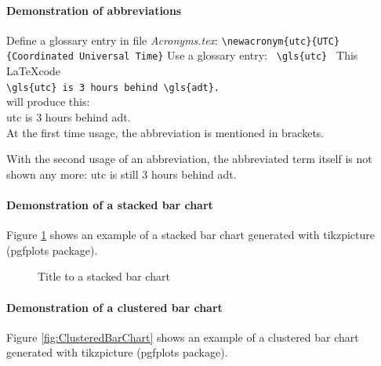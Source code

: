 \paragraph{Demonstration of abbreviations}
Define a glossary entry in file \textit{Acronyms.tex}:
\newline
\verb!\newacronym{utc}{UTC}{Coordinated Universal Time}!
\newline
Use a glossary entry: \verb! \gls{utc} !
\newline
This \LaTeX code \\

\verb*|\gls{utc} is 3 hours behind \gls{adt}.| \\

will produce this: \\

\gls{utc} is 3 hours behind \gls{adt}.\\

At the first time usage, the abbreviation is mentioned in brackets.

With the second usage of an abbreviation, the abbreviated term itself is not shown any more:
\gls{utc} is still 3 hours behind \gls{adt}.\\

\paragraph{Demonstration of a stacked bar chart}
Figure \ref{fig:StackedBarChart} shows an example of a stacked bar chart generated with tikzpicture (pgfplots package).

\begin{figure}
	\centering
	\caption{\label{fig:StackedBarChart}Title to a stacked bar chart}
\end{figure}

\paragraph{Demonstration of a clustered bar chart}
Figure \ref{fig:ClusteredBarChart} shows an example of a clustered bar chart generated with tikzpicture (pgfplots package).

